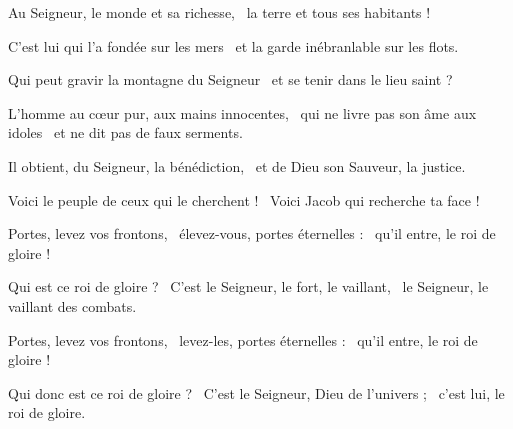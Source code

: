 \item Au Seigneur, le monde et sa richesse,~\psstar{} la terre et tous ses habitants !
\item C'est lui qui l'a fondée sur les mers~\psstar{} et la garde inébranlable sur les flots.
\item Qui peut gravir la montagne du Seigneur~\psstar{} et se tenir dans le lieu saint ?
\item L'homme au cœur pur, aux mains innocentes,~\pscross{} qui ne livre pas son âme aux idoles~\psstar{} et ne dit pas de faux serments.
\item Il obtient, du Seigneur, la bénédiction,~\psstar{} et de Dieu son Sauveur, la justice.
\item Voici le peuple de ceux qui le cherchent !~\psstar{} Voici Jacob qui recherche ta face !
\item Portes, levez vos frontons,~\pscross{} élevez-vous, portes éternelles :~\psstar{} qu'il entre, le roi de gloire !
\item Qui est ce roi de gloire ?~\pscross{} C'est le Seigneur, le fort, le vaillant,~\psstar{} le Seigneur, le vaillant des combats.
\item Portes, levez vos frontons,~\pscross{} levez-les, portes éternelles :~\psstar{} qu'il entre, le roi de gloire !
\item Qui donc est ce roi de gloire ?~\pscross{} C'est le Seigneur, Dieu de l'univers ;~\psstar{} c'est lui, le roi de gloire.
